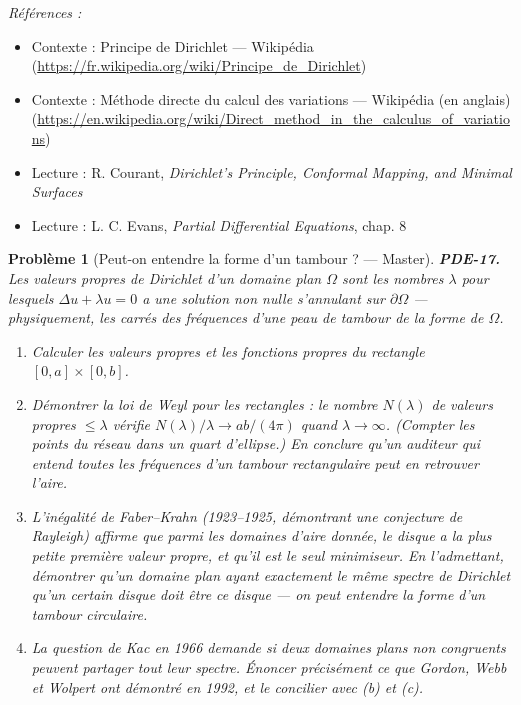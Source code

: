 \documentclass[11pt]{article}
\newtheorem{problem}{Problème}
\newenvironment{refs}{\par\small\noindent\emph{Références :}\begin{itemize}\setlength\itemsep{0pt}}{\end{itemize}\normalsize}
\begin{document}
\begin{refs}
\item Contexte : Principe de Dirichlet --- Wikipédia (\url{https://fr.wikipedia.org/wiki/Principe_de_Dirichlet})
\item Contexte : Méthode directe du calcul des variations --- Wikipédia (en anglais) (\url{https://en.wikipedia.org/wiki/Direct_method_in_the_calculus_of_variations})
\item Lecture : R. Courant, \textit{Dirichlet's Principle, Conformal Mapping, and Minimal Surfaces}
\item Lecture : L. C. Evans, \textit{Partial Differential Equations}, chap. 8
\end{refs}

\bigskip

\begin{problem}[{Peut-on entendre la forme d'un tambour ? --- Master}]
\textbf{PDE-17.} Les valeurs propres de Dirichlet d'un domaine plan
$\Omega$ sont les nombres $\lambda$ pour lesquels $\Delta u + \lambda u = 0$ a une
solution non nulle s'annulant sur $\partial\Omega$ --- physiquement, les carrés des
fréquences d'une peau de tambour de la forme de $\Omega$.
\begin{enumerate}
\item[(a)] Calculer les valeurs propres et
les fonctions propres du rectangle $[0,a] \times [0,b]$.
\item[(b)] Démontrer la loi de Weyl pour
les rectangles : le nombre $N(\lambda)$ de valeurs propres $\le \lambda$ vérifie
$N(\lambda)/\lambda \to ab/(4\pi)$ quand $\lambda \to \infty$. (Compter les points du
réseau dans un quart d'ellipse.) En conclure qu'un auditeur qui entend toutes les
fréquences d'un tambour rectangulaire peut en retrouver l'aire.
\item[(c)] L'inégalité de
Faber--Krahn (1923--1925, démontrant une conjecture de Rayleigh) affirme que parmi les domaines
d'aire donnée, le disque a la plus petite première valeur propre, et qu'il est le seul
minimiseur. En l'admettant, démontrer qu'un domaine plan ayant exactement le même spectre de
Dirichlet qu'un certain disque doit être ce disque --- on \textit{peut} entendre la forme d'un
tambour circulaire.
\item[(d)] La question de Kac en 1966 demande si deux domaines plans non congruents peuvent partager
tout leur spectre. Énoncer précisément ce que Gordon, Webb et Wolpert ont démontré en
1992, et le concilier avec (b) et (c).
\end{enumerate}

\end{problem}
\end{document}
